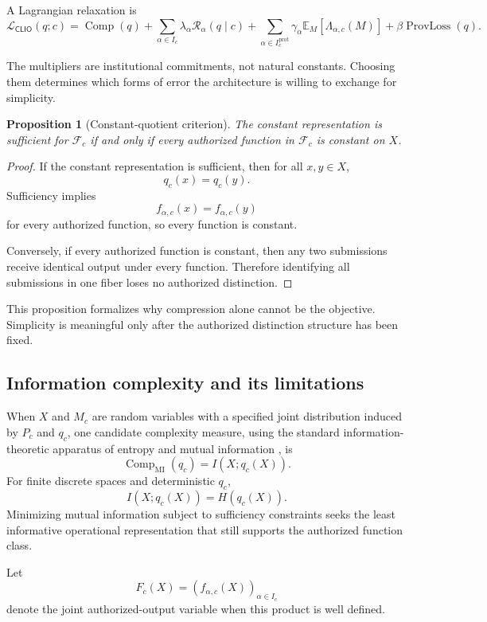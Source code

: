 \documentclass[11pt]{article}
\newtheorem{proposition}[definition]{Proposition}
\theoremstyle{definition}
\DeclareMathOperator{\Comp}{Comp}
\newcommand{\E}{\mathbb{E}}
\newcommand{\F}{\mathcal{F}}
\newcommand{\CLIO}{\mathsf{CLIO}}
\begin{document}
A Lagrangian relaxation is
\[
\mathcal L_{\CLIO}(q;c)
=
\Comp(q)
+
\sum_{\alpha\in I_c}
\lambda_\alpha
\mathcal R_\alpha(q\mid c)
+
\sum_{\alpha\in I_c^{\mathrm{prot}}}
\gamma_\alpha
\E_M[\Lambda_{\alpha,c}(M)]
+
\beta\operatorname{ProvLoss}(q).
\]

The multipliers are institutional commitments, not natural constants. Choosing them determines which forms of error the architecture is willing to exchange for simplicity.

\begin{proposition}[Constant-quotient criterion]
The constant representation is sufficient for \(\F_c\) if and only if every authorized function in \(\F_c\) is constant on \(X\).
\end{proposition}

\begin{proof}
If the constant representation is sufficient, then for all \(x,y\in X\),
\[
q_c(x)=q_c(y).
\]
Sufficiency implies
\[
f_{\alpha,c}(x)=f_{\alpha,c}(y)
\]
for every authorized function, so every function is constant.

Conversely, if every authorized function is constant, then any two submissions receive identical output under every function. Therefore identifying all submissions in one fiber loses no authorized distinction.
\end{proof}

This proposition formalizes why compression alone cannot be the objective. Simplicity is meaningful only after the authorized distinction structure has been fixed.

\subsection{Information complexity and its limitations}

When \(X\) and \(M_c\) are random variables with a specified joint distribution induced by \(P_c\) and \(q_c\), one candidate complexity measure, using the standard information-theoretic apparatus of entropy and mutual information \cite{cover2006}, is
\[
\Comp_{\mathrm{MI}}(q_c)
=
I(X;q_c(X)).
\]
For finite discrete spaces and deterministic \(q_c\),
\[
I(X;q_c(X))
=
H(q_c(X)).
\]
Minimizing mutual information subject to sufficiency constraints seeks the least informative operational representation that still supports the authorized function class.

Let
\[
F_c(X)
=
\left(
f_{\alpha,c}(X)
\right)_{\alpha\in I_c}
\]
denote the joint authorized-output variable when this product is well defined.
\end{document}
